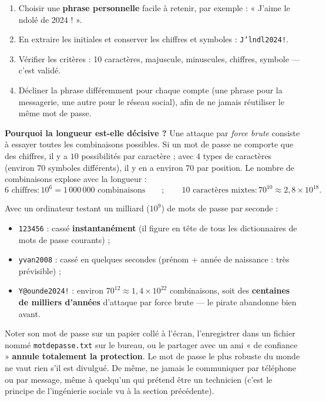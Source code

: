 \documentclass[11pt]{article}
\begin{document}
\begin{methode}
\begin{enumerate}
\item Choisir une \textbf{phrase personnelle} facile à retenir, par exemple : « J'aime le ndolé de 2024 ! ».
\item En extraire les initiales et conserver les chiffres et symboles : \texttt{J'lndl2024!}.
\item Vérifier les critères : 10 caractères, majuscule, minuscules, chiffres, symbole — c'est validé.
\item Décliner la phrase différemment pour chaque compte (une phrase pour la messagerie, une autre pour le réseau social), afin de ne jamais réutiliser le même mot de passe.
\end{enumerate}
\end{methode}

\textbf{Pourquoi la longueur est-elle décisive ?} Une attaque par \emph{force brute} consiste à essayer toutes les combinaisons possibles. Si un mot de passe ne comporte que des chiffres, il y a $10$ possibilités par caractère ; avec $4$ types de caractères (environ $70$ symboles différents), il y en a environ $70$ par position. Le nombre de combinaisons explose avec la longueur :
\[ \text{6 chiffres} : 10^6 = 1\,000\,000 \text{ combinaisons} \qquad ; \qquad \text{10 caractères mixtes} : 70^{10} \approx 2{,}8 \times 10^{18}. \]

\begin{exemplebox}
Avec un ordinateur testant un milliard ($10^9$) de mots de passe par seconde :
\begin{itemize}
\item \texttt{123456} : cassé \textbf{instantanément} (il figure en tête de tous les dictionnaires de mots de passe courants) ;
\item \texttt{yvan2008} : cassé en quelques secondes (prénom + année de naissance : très prévisible) ;
\item \texttt{Y@ounde2024!} : environ $70^{12} \approx 1{,}4 \times 10^{22}$ combinaisons, soit des \textbf{centaines de milliers d'années} d'attaque par force brute — le pirate abandonne bien avant.
\end{itemize}
\end{exemplebox}

\begin{attention}
Noter son mot de passe sur un papier collé à l'écran, l'enregistrer dans un fichier nommé \texttt{motdepasse.txt} sur le bureau, ou le partager avec un ami « de confiance » \textbf{annule totalement la protection}. Le mot de passe le plus robuste du monde ne vaut rien s'il est divulgué. De même, ne jamais le communiquer par téléphone ou par message, même à quelqu'un qui prétend être un technicien (c'est le principe de l'ingénierie sociale vu à la section précédente).
\end{attention}
\end{document}
